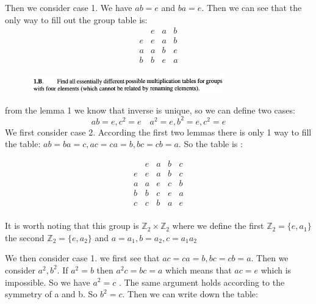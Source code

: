 Then we consider case 1. We have $ ab = e $ and $ ba = e $. Then we can see that the only way to fill out the group table is:
\[
\begin{array}{c|ccc}
 & e & a & b \\
\hline
e & e & a & b \\
a & a & b & e \\
b & b & e & a \\
\end{array}
\]
\line
\begin{figure}[H]
  \centering
  \includegraphics[width=0.75\textwidth]{assets/Ques2.png}
  \label{fig:ques2}
\end{figure}
from the lemma 1 we know that inverse is unique, so we can define two cases:
\begin{equation}
  ab = e, c^2 = e  \quad a^2 = e, b^2 = e, c^2 = e  
  \label{eq:inverse}
\end{equation}
We first consider case 2. According the first two lemmas there is only 1 way to fill the table: $ ab = ba = c, ac = ca =b, bc = cb = a $. So the table is :

\[
 \begin{array}{c|cccc}
 & e & a & b & c\\
\hline
   e & e & a & b&c \\
   a & a & e & c &b  \\
   b & b & c & e & a\\
   c & c & b & a & e \\
\end{array}
\]

It is worth noting that this group is $ \mathbb{Z}_2 \times \mathbb{Z}_2$ where we define the first $ \mathbb{Z}_2 = \{e,a_1\} $ the second $ \mathbb{Z}_2 = \{e,a_2\} $ and $ a = a_1, b = a_2, c = a_1 a_2 $

We then consider case 1. we first see that $ ac = ca = b, bc = cb = a $. Then we consider $ a^2, b^2 $. If $ a^2 = b $ then $ a^2 c = bc  = a $ which means that $ ac = e $ which is impossible. So we have $ a^2 = c $ . The same argument holds according to the symmetry of a and b. So $ b^2 = c $. Then we can write down the table:


